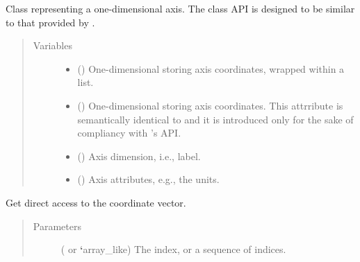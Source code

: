 \documentclass[letterpaper,10pt,english]{sphinxmanual}
\begin{document}
\begin{fulllineitems}
\label{\detokenize{api:tasmania.grids.axis.Axis}}
Class representing a one-dimensional axis. The class API is designed to be similar to
that provided by .
\begin{quote}\begin{description}
\item[{Variables}] \leavevmode\begin{itemize}
\item {} 
 () \textendash{} One-dimensional  storing axis coordinates, wrapped within a list.

\item {} 
 () \textendash{} One-dimensional  storing axis coordinates. This attrribute is semantically identical
to  and it is introduced only for the sake of compliancy with
’s API.

\item {} 
 () \textendash{} Axis dimension, i.e., label.

\item {} 
 () \textendash{} Axis attributes, e.g., the units.

\end{itemize}

\end{description}\end{quote}

\begin{fulllineitems}
\label{\detokenize{api:tasmania.grids.axis.Axis.__getitem__}}
Get direct access to the coordinate vector.
\begin{quote}\begin{description}
\item[{Parameters}] \leavevmode
{} ( or {\color{red}\bfseries{}{}`}array\_like) \textendash{} The index, or a sequence of indices.


\end{description}
\end{quote}
\end{fulllineitems}
\end{fulllineitems}
\end{document}
